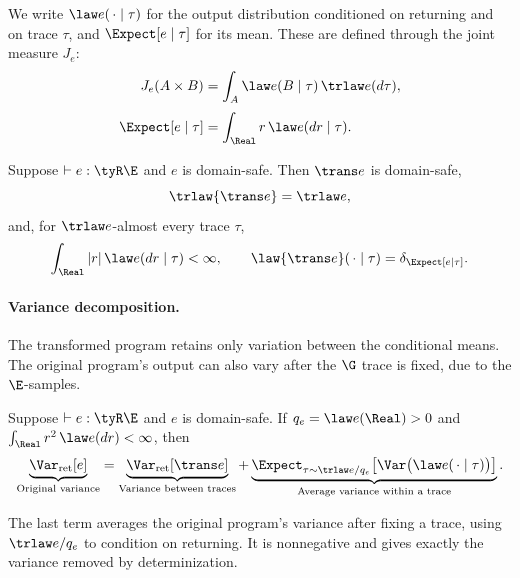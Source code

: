 We write $\law e(\,\cdot\mid\tau)$ for the output distribution conditioned on
returning and on trace $\tau$, and $\Expect[e\mid\tau]$ for its mean.
These are defined through the joint measure $J_e$:
\[
\begin{aligned}
 J_e(A\times B)&=\int_A \law e(B\mid\tau)\,\trlaw e(d\tau),\\[3pt]
 \Expect[e\mid\tau]&=\int_{\Real}r\,\law e(dr\mid\tau).
\end{aligned}
\]

\begin{theorem}
\label{thm:trace-soundness}
Suppose $\vdash e:\tyR\E$ and $e$ is domain-safe. Then $\trans e$ is domain-safe,
\[
 \trlaw{\trans e}=\trlaw e,
\]
and, for $\trlaw e$-almost every trace $\tau$,
\[
 \int_{\Real}|r|\,\law e(dr\mid\tau)<\infty,
 \qquad
 \law{\trans e}(\,\cdot\mid\tau)
 =\delta_{\Expect[e\mid\tau]}.
\]
\end{theorem}

\paragraph{Variance decomposition.}
The transformed program retains only variation between the conditional means.
The original program's output can also vary after the $\G$ trace is fixed,
due to the $\E$-samples.

\begin{theorem}
\label{thm:trace-variance}
Suppose $\vdash e:\tyR\E$ and $e$ is domain-safe. If
$q_e=\law e(\Real)>0$ and $\int_{\Real}r^2\,\law e(dr)<\infty$, then
\[
 \underbrace{\Var_{\mathrm{ret}}[e]}_{\text{Original variance}}
 =\underbrace{\Var_{\mathrm{ret}}[\trans e]}_{\text{Variance between traces}}
  +\underbrace{\Expect_{\tau\sim\trlaw e/q_e}
    \!\left[\Var\bigl(\law e(\,\cdot\mid\tau)\bigr)\right]}_{\text{Average variance within a trace}}.
\]
\end{theorem}

The last term averages the original program's variance after fixing a trace, using
$\trlaw e/q_e$ to condition on returning. It is nonnegative and gives exactly
the variance removed by determinization.

